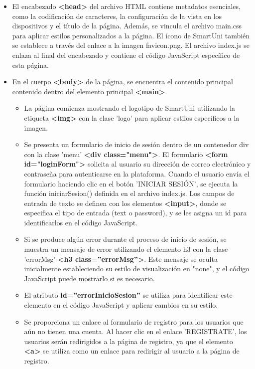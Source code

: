 \documentclass[12pt]{report}
\begin{document}
\begin{itemize}
    \item El encabezado\textbf{ \textless head\textgreater} del archivo HTML contiene metadatos esenciales, como la codificación de caracteres, la configuración de la vista en los dispositivos y el título de la página. Además, se vincula el archivo main.css para aplicar estilos personalizados a la página. El ícono de SmartUni también se establece a través del enlace a la imagen favicon.png. El archivo index.js se enlaza al final del encabezado y contiene el código JavaScript específico de esta página.

    \item En el cuerpo\textbf{ \textless body\textgreater} de la página, se encuentra el contenido principal contenido dentro del elemento principal \textbf{ \textless main\textgreater}. 

    \begin{itemize}
        \item La página comienza mostrando el logotipo de SmartUni utilizando la etiqueta\textbf{ \textless img\textgreater} con la clase 'logo' para aplicar estilos específicos a la imagen.
        
        \item Se presenta un formulario de inicio de sesión dentro de un contenedor div con la clase 'menu'\textbf{ \textless div class="menu"\textgreater}. El formulario\textbf{ \textless form id="loginForm"\textgreater} solicita al usuario su dirección de correo electrónico y contraseña para autenticarse en la plataforma. Cuando el usuario envía el formulario haciendo clic en el botón 'INICIAR SESIÓN', se ejecuta la función iniciarSesion() definida en el archivo index.js. Los campos de entrada de texto se definen con los elementos\textbf{ \textless input\textgreater}, donde se especifica el tipo de entrada (text o password), y se les asigna un id para identificarlos en el código JavaScript.
        
        \item Si se produce algún error durante el proceso de inicio de sesión, se muestra un mensaje de error utilizando el elemento h3 con la clase 'errorMsg'\textbf{ \textless h3 class=''errorMsg''\textgreater}. Este mensaje se oculta inicialmente estableciendo su estilo de visualización en "none", y el código JavaScript puede mostrarlo si es necesario.
        
        \item  El atributo \textbf{id=''errorInicioSesion''} se utiliza para identificar este elemento en el código JavaScript y aplicar cambios en su estilo.
        
        \item Se proporciona un enlace al formulario de registro para los usuarios que aún no tienen una cuenta. Al hacer clic en el enlace 'REGISTRATE', los usuarios serán redirigidos a la página de registro, ya que el elemento \textbf{\textless a\textgreater} se utiliza como un enlace para redirigir al usuario a la página de registro.
    \end{itemize}
\end{itemize}
\end{document}
